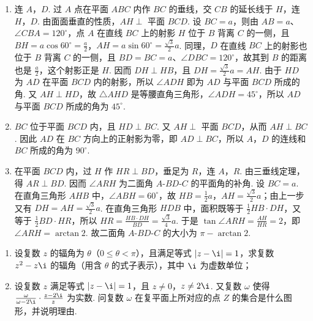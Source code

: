 \documentclass[UTF8,a4paper,oneside,11pt]{ctexbook}
\begin{document}
\begin{solution}
\begin{enumerate}
\item 连 \(A\)，\(D\). 过 \(A\) 点在平面 \(ABC\) 内作 \(BC\) 的垂线，交 \(CB\) 的延长线于 \(H\)，连 \(H\)，\(D\). 由面面垂直的性质，\(AH \perp\) 平面 \(BCD\). 设 \(BC=a\)，则由 \(AB=a\)、\(\angle CBA=120^{\circ}\)，点 \(A\) 在直线 \(BC\) 上的射影 \(H\) 位于 \(B\) 背离 \(C\) 的一侧，且 \(BH=a\cos60^{\circ}=\frac a2\)，\(AH=a\sin60^{\circ}=\frac{\sqrt3}{2}a\). 同理，\(D\) 在直线 \(BC\) 上的射影也位于 \(B\) 背离 \(C\) 的一侧，且 \(BD=BC=a\)、\(\angle DBC=120^{\circ}\)，故其到 \(B\) 的距离也是 \(\frac a2\)，这个射影正是 \(H\). 因而 \(DH\perp HB\)，且 \(DH=\frac{\sqrt3}{2}a=AH\). 由于 \(HD\) 为 \(AD\) 在平面 \(BCD\) 内的射影，所以 \(\angle ADH\) 即为 \(AD\) 与平面 \(BCD\) 所成的角. 又 \(AH\perp HD\)，故 \(\triangle AHD\) 是等腰直角三角形，\(\angle ADH=45^{\circ}\)，所以 \(AD\) 与平面 \(BCD\) 所成的角为 \(45^{\circ}\).
\item \(BC\) 位于平面 \(BCD\) 内，且 \(HD\perp BC\). 又 \(AH\perp\) 平面 \(BCD\)，从而 \(AH\perp BC\). 因此 \(AD\) 在 \(BC\) 方向上的正射影为零，即 \(AD\perp BC\)，所以 \(A\)，\(D\) 的连线和 \(BC\) 所成的角为 \(90^{\circ}\).
\item 在平面 \(BCD\) 内，过 \(H\) 作 \(HR\perp BD\)，垂足为 \(R\)，连 \(A\)，\(R\). 由三垂线定理，得 \(AR\perp BD\). 因而 \(\angle ARH\) 为二面角 \(A\text{-}BD\text{-}C\) 的平面角的补角. 设 \(BC=a\). 在直角三角形 \(AHB\) 中，\(\angle ABH=60^{\circ}\)，故 \(HB=\frac12a\)，\(AH=\frac{\sqrt3}{2}a\)；由上一步又有 \(DH=AH=\frac{\sqrt3}{2}a\). 在直角三角形 \(HDB\) 中，面积既等于 \(\frac12HB\cdot DH\)，又等于 \(\frac12BD\cdot HR\)，所以
\(HR=\frac{HB\cdot DH}{BD}=\frac{\sqrt3}{4}a\). 于是 \(\tan\angle ARH=\frac{AH}{HR}=2\)，即 \(\angle ARH=\arctan2\). 故二面角 \(A\text{-}BD\text{-}C\) 的大小为 \(\pi-\arctan2\).
\end{enumerate}
\end{solution}

\begin{problem}
\begin{enumerate}
\item 设复数 \(z\) 的辐角为 \(\theta\)（\(0 \leqslant \theta < \pi\)），且满足等式 \(|z - \i| = 1\)，求复数 \(z^2 - z\i\) 的辐角（用含 \(\theta\) 的式子表示），其中 \(\i\) 为虚数单位；
\item 设复数 \(z\) 满足等式 \(|z - \i| = 1\)，且 \(z \neq 0\)，\(z \neq 2\i\). 又复数 \(\omega\) 使得 \(\frac{\omega}{\omega - 2\i} \cdot \frac{z - 2\i}{z}\) 为实数. 问复数 \(\omega\) 在复平面上所对应的点 \(Z\) 的集合是什么图形，并说明理由.
\end{enumerate}
\end{problem}
\end{document}

